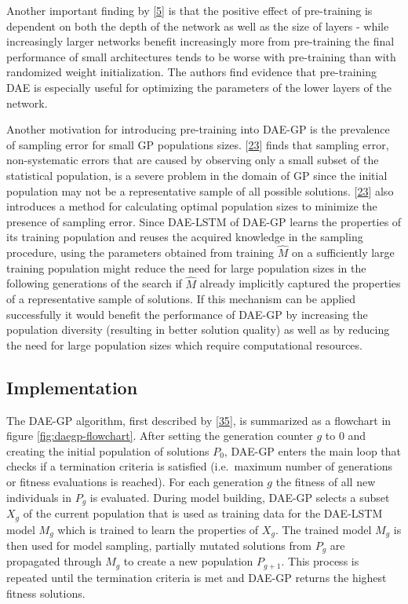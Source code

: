 \documentclass[
  11pt,
]{article}
\begin{document}
Another important finding by {[}\protect\hyperlink{ref-pmlr-v5-erhan09a}{5}{]} is that the positive effect of pre-training is dependent on both the depth of the network as well as the size of layers - while increasingly larger networks benefit increasingly more from pre-training the final performance of small architectures tends to be worse with pre-training than with randomized weight initialization.
The authors find evidence that pre-training DAE is especially useful for optimizing the parameters of the lower layers of the network.

Another motivation for introducing pre-training into DAE-GP is the prevalence of sampling error for small GP populations sizes.
{[}\protect\hyperlink{ref-sampling_err_gp}{23}{]} finds that sampling error, non-systematic errors that are caused by observing only a small subset of the statistical population, is a severe problem in the domain of GP since the initial population may not be a representative sample of all possible solutions.
{[}\protect\hyperlink{ref-sampling_err_gp}{23}{]} also introduces a method for calculating optimal population sizes to minimize the presence of sampling error.
Since DAE-LSTM of DAE-GP learns the properties of its training population and reuses the acquired knowledge in the sampling procedure, using the parameters obtained from training \(\hat{M}\) on a sufficiently large training population might reduce the need for large population sizes in the following generations of the search if \(\hat{M}\) already implicitly captured the properties of a representative sample of solutions.
If this mechanism can be applied successfully it would benefit the performance of DAE-GP by increasing the population diversity (resulting in better solution quality) as well as by reducing the need for large population sizes which require computational resources.

\hypertarget{implementation}{%
\subsection{Implementation}\label{implementation}}

The DAE-GP algorithm, first described by {[}\protect\hyperlink{ref-dae-gp_2020_rtree}{35}{]}, is summarized as a flowchart in figure \ref{fig:daegp-flowchart}.
After setting the generation counter \(g\) to \(0\) and creating the initial population of solutions \(P_0\), DAE-GP enters the main loop that checks if a termination criteria is satisfied (i.e.~maximum number of generations or fitness evaluations is reached).
For each generation \(g\) the fitness of all new individuals in \(P_g\) is evaluated.
During model building, DAE-GP selects a subset \(X_g\) of the current population that is used as training data for the DAE-LSTM model \(M_g\) which is trained to learn the properties of \(X_g\).
The trained model \(M_g\) is then used for model sampling, partially mutated solutions from \(P_g\) are propagated through \(M_g\) to create a new population \(P_{g+1}\).
This process is repeated until the termination criteria is met and DAE-GP returns the highest fitness solutions.
\end{document}
